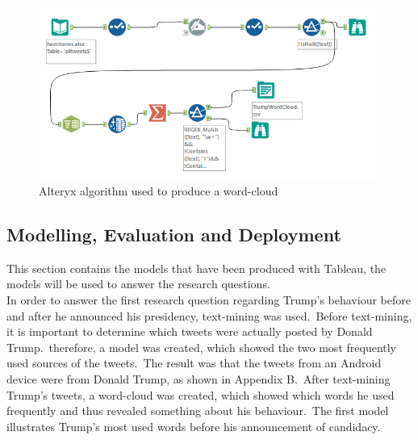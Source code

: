 \documentclass[12pt]{article}
\begin{document}
\begin{figure}[H] %
	\centering %
\includegraphics [scale= .65]  {TrumpWordCloudAlteryxFinal.PNG}    %
	\caption[Optional caption] {Alteryx algorithm used to produce a word-cloud}
	\label{fig:wordcloudBliz}

\end{figure}

\subsection{Modelling, Evaluation and Deployment}
This section contains the models that have been produced with Tableau, the models will be used to answer the research questions. \\

In order to answer the first research question regarding Trump's behaviour before and after he announced his presidency, text-mining was used.\  Before text-mining, it is important to determine which tweets were actually posted by Donald Trump.\ therefore, a model was created, which showed the two most frequently used sources of the tweets.\ The result was that the tweets from an Android device were from Donald Trump, as shown in Appendix B.\ After text-mining Trump's tweets, a word-cloud was created, which showed which words he used frequently and thus revealed something about his behaviour.\ The first model illustrates Trump's most used words before his announcement of candidacy.
\end{document}
